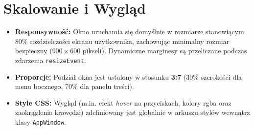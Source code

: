 \documentclass[a4paper,12pt]{article}
\begin{document}
\section{Skalowanie i Wygląd}
\begin{itemize}
    \item \textbf{Responsywność:} Okno uruchamia się domyślnie w rozmiarze stanowiącym $80\%$ rozdzielczości ekranu użytkownika, zachowując minimalny rozmiar bezpieczny ($900 \times 600$ pikseli). Dynamiczne marginesy są przeliczane podczas zdarzenia \texttt{resizeEvent}.
    \item \textbf{Proporcje:} Podział okna jest ustalony w stosunku \textbf{3:7} (30\% szerokości dla menu bocznego, 70\% dla panelu treści).
    \item \textbf{Style CSS:} Wygląd (m.in. efekt \textit{hover} na przyciskach, kolory rgba oraz zaokrąglenia krawędzi) zdefiniowany jest globalnie w arkuszu stylów wewnątrz klasy \texttt{AppWindow}.
\end{itemize}
\end{document}
